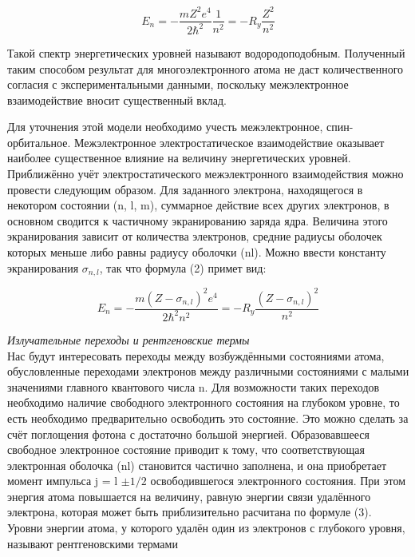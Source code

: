 \documentclass[a4paper, 12pt]{article}%
\begin{document}
	\begin{equation}
		E_n=-\frac{m Z^2 e^4}{2 \hbar^2} \frac{1}{n^2}=-R_y \frac{Z^2}{n^2}
	\end{equation}
	
	Такой спектр энергетических уровней называют водородоподобным. Полученный таким
	способом результат для многоэлектронного атома не даст количественного согласия с экспериментальными данными, поскольку межэлектронное
	взаимодействие вносит существенный вклад.
	
	Для уточнения этой модели необходимо учесть межэлектронное, спин-орбитальное. Межэлектронное электростатическое взаимодействие оказывает наиболее существенное влияние
	на величину энергетических уровней.
	Приближённо учёт электростатического межэлектронного взаимодействия можно провести следующим образом. Для заданного электрона,
	находящегося в некотором состоянии (n, l, m), суммарное действие всех
	других электронов, в основном сводится к частичному экранированию
	заряда ядра. Величина этого экранирования зависит от количества электронов, средние радиусы оболочек которых меньше либо равны радиусу оболочки (nl). Можно ввести константу экранирования $\sigma_{n, l}$, так что
	формула (2) примет вид:
	
	\begin{equation}
		E_n=-\frac{m (Z - \sigma_{n, l})^2 e^4}{2 \hbar^2 n^2}=-R_y \frac{(Z - \sigma_{n, l})^2}{n^2}
	\end{equation}

	\addvspace{20pt}

	\textit{Излучательные переходы и рентгеновские термы}\\
	
	Нас будут интересовать переходы между возбуждёнными состояниями атома, обусловленные переходами электронов между различными состояниями с малыми значениями главного квантового
	числа n. Для возможности таких переходов необходимо наличие свободного электронного состояния на глубоком уровне, то есть необходимо
	предварительно освободить это состояние. Это
	можно сделать за счёт поглощения фотона с достаточно большой энергией. Образовавшееся свободное электронное состояние приводит к тому,
	что соответствующая электронная оболочка (nl) становится частично заполнена, и она приобретает момент импульса j = l $\pm 1/2$
	освободившегося
	электронного состояния. При этом энергия атома повышается на величину, равную энергии связи удалённого электрона, которая может быть
	приблизительно расчитана по формуле (3). Уровни энергии атома, у
	которого удалён один из электронов с глубокого уровня, называют рентгеновскими термами
	
\end{document}
